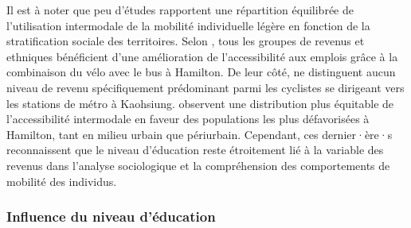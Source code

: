 \begin{refsegment}
Il est à noter que peu d'études rapportent une répartition équilibrée de l'utilisation intermodale de la mobilité individuelle légère en fonction de la stratification sociale des territoires. Selon \textcolor{blue}{\textcite[10]{zuo_first-and-last_2020}}, tous les groupes de revenus et ethniques bénéficient d'une amélioration de l'accessibilité aux emplois grâce à la combinaison du vélo avec le bus à Hamilton. De leur côté, \textcolor{blue}{\textcite[1~696]{cheng_evaluating_2012}} ne distinguent aucun niveau de revenu spécifiquement prédominant parmi les cyclistes se dirigeant vers les stations de métro à Kaohsiung. \textcolor{blue}{\textcite[86]{zuo_incorporating_2021}} observent une distribution plus équitable de l'accessibilité intermodale en faveur des populations les plus défavorisées à Hamilton, tant en milieu urbain que périurbain. Cependant, ces dernier·ère·s reconnaissent que le niveau d'éducation reste étroitement lié à la variable des revenus dans l'analyse sociologique et la compréhension des comportements de mobilité des individus.%

\subsubsection*{Influence du niveau d'éducation
    \label{chap2:education}
    }
    

\end{refsegment}
